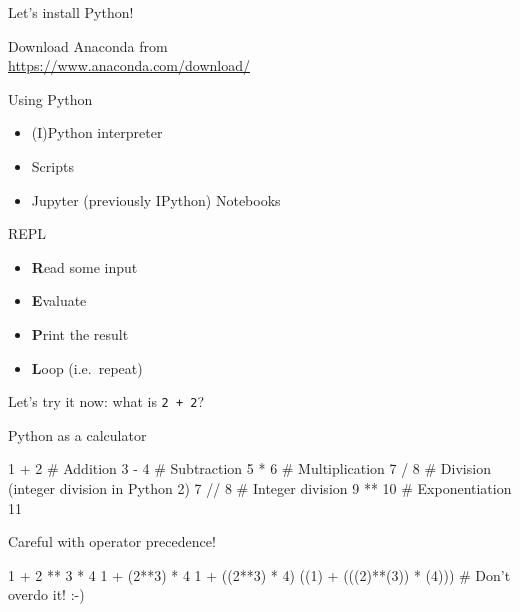 \begin{frame}{Let's install Python!}
    \begin{center}
        \Large%
        Download Anaconda from \\[\medskipamount]
        \url{https://www.anaconda.com/download/}
    \end{center}
\end{frame}

\begin{frame}{Using Python}
    \begin{itemize}
        \setlength{\itemsep}{0.75em}
        \item (I)Python interpreter
        \item Scripts
        \item Jupyter (previously IPython) Notebooks
    \end{itemize}
\end{frame}

\begin{frame}[fragile]{REPL}
    \begin{itemize}
        \item \textbf{R}ead some input
        \item \textbf{E}valuate
        \item \textbf{P}rint the result
        \item \textbf{L}oop (i.e.\ repeat)
    \end{itemize}
    \vfill
    \begin{center}
        Let's try it now: what is \texttt{2 + 2}?
    \end{center}
\end{frame}

\begin{frame}[fragile]{Python as a calculator}
    \begin{py3}
        1 + 2    # Addition
        3 - 4    # Subtraction
        5 * 6    # Multiplication
        7 / 8    # Division (integer division in Python 2)
        7 // 8   # Integer division
        9 ** 10  # Exponentiation
        11 %
    \end{py3}
\end{frame}

\begin{frame}[fragile]{Careful with operator precedence!}
    \begin{py3}
        1 + 2 ** 3 * 4
        1 + (2**3) * 4
        1 + ((2**3) * 4)
        ((1) + (((2)**(3)) * (4)))  # Don't overdo it! :-)
    \end{py3}
\end{frame}

